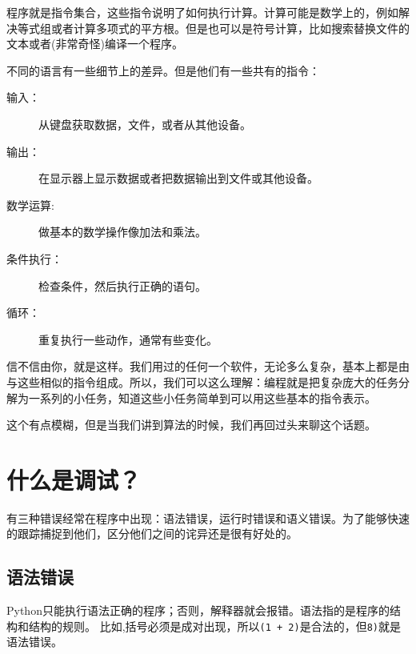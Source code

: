 程序就是指令集合，这些指令说明了如何执行计算。计算可能是数学上的，例如解决等式组或者计算多项式的平方根。但是也可以是符号计算，比如搜索替换文件的文本或者(非常奇怪)编译一个程序。


不同的语言有一些细节上的差异。但是他们有一些共有的指令：

\begin{description}

\item[输入：] 从键盘获取数据，文件，或者从其他设备。

\item[输出：] 在显示器上显示数据或者把数据输出到文件或其他设备。

\item[数学运算:] 做基本的数学操作像加法和乘法。

\item[条件执行：]检查条件，然后执行正确的语句。

\item[循环：]重复执行一些动作，通常有些变化。

\end{description}

信不信由你，就是这样。我们用过的任何一个软件，无论多么复杂，基本上都是由与这些相似的指令组成。所以，我们可以这么理解：编程就是把复杂庞大的任务分解为一系列的小任务，知道这些小任务简单到可以用这些基本的指令表示。


这个有点模糊，但是当我们讲到算法的时候，我们再回过头来聊这个话题。

\section{什么是调试？}

有三种错误经常在程序中出现：语法错误，运行时错误和语义错误。为了能够快速的跟踪捕捉到他们，区分他们之间的诧异还是很有好处的。

\subsection{语法错误}

Python只能执行语法正确的程序；否则，解释器就会报错。语法指的是程序的结构和结构的规则。
比如,括号必须是成对出现，所以{\tt (1 + 2)}是合法的，但{\tt 8)}就是语法错误。


